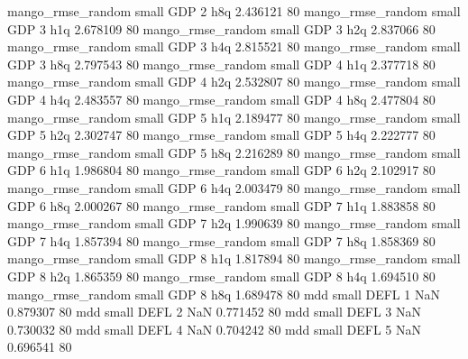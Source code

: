 mango_rmse_random      small      GDP                 2                  h8q 2.436121 80
mango_rmse_random      small      GDP                 3                  h1q 2.678109 80
mango_rmse_random      small      GDP                 3                  h2q 2.837066 80
mango_rmse_random      small      GDP                 3                  h4q 2.815521 80
mango_rmse_random      small      GDP                 3                  h8q 2.797543 80
mango_rmse_random      small      GDP                 4                  h1q 2.377718 80
mango_rmse_random      small      GDP                 4                  h2q 2.532807 80
mango_rmse_random      small      GDP                 4                  h4q 2.483557 80
mango_rmse_random      small      GDP                 4                  h8q 2.477804 80
mango_rmse_random      small      GDP                 5                  h1q 2.189477 80
mango_rmse_random      small      GDP                 5                  h2q 2.302747 80
mango_rmse_random      small      GDP                 5                  h4q 2.222777 80
mango_rmse_random      small      GDP                 5                  h8q 2.216289 80
mango_rmse_random      small      GDP                 6                  h1q 1.986804 80
mango_rmse_random      small      GDP                 6                  h2q 2.102917 80
mango_rmse_random      small      GDP                 6                  h4q 2.003479 80
mango_rmse_random      small      GDP                 6                  h8q 2.000267 80
mango_rmse_random      small      GDP                 7                  h1q 1.883858 80
mango_rmse_random      small      GDP                 7                  h2q 1.990639 80
mango_rmse_random      small      GDP                 7                  h4q 1.857394 80
mango_rmse_random      small      GDP                 7                  h8q 1.858369 80
mango_rmse_random      small      GDP                 8                  h1q 1.817894 80
mango_rmse_random      small      GDP                 8                  h2q 1.865359 80
mango_rmse_random      small      GDP                 8                  h4q 1.694510 80
mango_rmse_random      small      GDP                 8                  h8q 1.689478 80
              mdd      small     DEFL                 1                  NaN 0.879307 80
              mdd      small     DEFL                 2                  NaN 0.771452 80
              mdd      small     DEFL                 3                  NaN 0.730032 80
              mdd      small     DEFL                 4                  NaN 0.704242 80
              mdd      small     DEFL                 5                  NaN 0.696541 80
